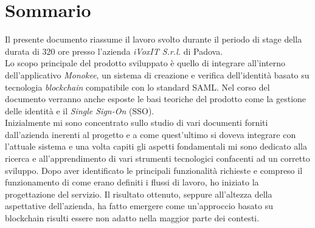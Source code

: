 
\cleardoublepage
{}
{}
\begingroup
\let\clearpage\relax
\let\cleardoublepage\relax
\let\cleardoublepage\relax

\chapter*{Sommario}

Il presente documento riassume il lavoro svolto durante il periodo di stage della durata
di 320 ore presso l’azienda \emph{iVoxIT S.r.l.} di Padova.\\
Lo scopo principale del prodotto sviluppato è quello di integrare all'interno dell'applicativo \emph{Monokee}, un sistema di creazione e verifica dell'identità basato su tecnologia \emph{blockchain} compatibile con lo standard SAML. 
Nel corso del documento verranno anche esposte le basi teoriche del prodotto come la gestione delle identità e il \emph{Single Sign-On} (SSO).\\
Inizialmente mi sono concentrato sullo studio di vari documenti forniti dall'azienda inerenti al progetto e a come quest'ultimo si doveva integrare con l'attuale sistema e
una volta capiti gli aspetti fondamentali mi sono dedicato alla ricerca e all'apprendimento di vari strumenti tecnologici
confacenti ad un corretto sviluppo.                 
Dopo aver identificato le principali funzionalità richieste e compreso il funzionamento di come erano definiti i flussi di lavoro, ho iniziato la progettazione del servizio.
Il risultato ottenuto, seppure all’altezza della aspettative dell’azienda, ha fatto emergere come un'approccio basato su blockchain risulti essere non adatto nella maggior parte dei contesti.


%
%

\endgroup			

\vfill

